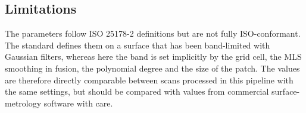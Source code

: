 \subsection{Limitations}
\label{subsec:Rough-Limitations}

The parameters follow ISO 25178-2 definitions but are not fully ISO-conformant. The standard defines them on a surface that has been band-limited with Gaussian filters, whereas here the band is set implicitly by the grid cell, the MLS smoothing in fusion, the polynomial degree and the size of the patch. The values are therefore directly comparable between scans processed in this pipeline with the same settings, but should be compared with values from commercial surface-metrology software with care.



